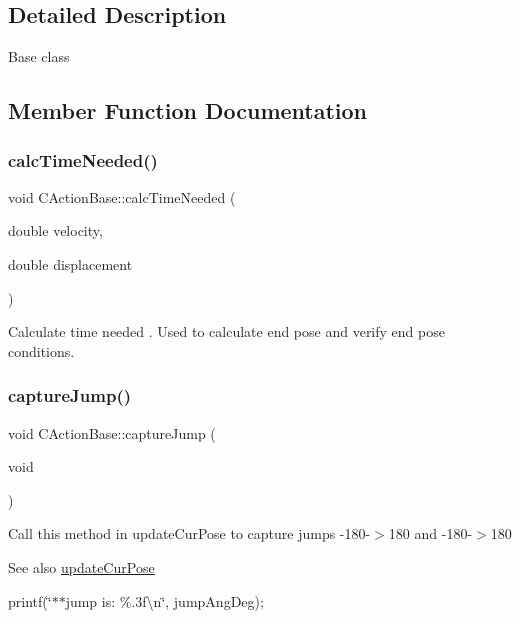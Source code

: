 \subsection{Detailed Description}
Base class ~\newline


\subsection{Member Function Documentation}
\mbox{\label{classmotion_1_1CActionBase_a90058a23162d40496c60ed44578c2f69}} 
\subsubsection{\texorpdfstring{calc\+Time\+Needed()}{calcTimeNeeded()}}
{\footnotesize\ttfamily void C\+Action\+Base\+::calc\+Time\+Needed (\begin{DoxyParamCaption}\item[{double}]{velocity,  }\item[{double}]{displacement }\end{DoxyParamCaption})}

Calculate time needed . Used to calculate end pose and verify end pose conditions. \mbox{\label{classmotion_1_1CActionBase_a48d2c07fa908bf6ed57e3219a017b25e}} 
\subsubsection{\texorpdfstring{capture\+Jump()}{captureJump()}}
{\footnotesize\ttfamily void C\+Action\+Base\+::capture\+Jump (\begin{DoxyParamCaption}\item[{void}]{ }\end{DoxyParamCaption})}

Call this method in update\+Cur\+Pose to capture jumps -\/180-\/$>$180 and -\/180-\/$>$180 \begin{DoxySeeAlso}{See also}
\mbox{\hyperlink{classmotion_1_1CActionBase_a5fd00b2fca445758e6cbf4d5a92a5082}{update\+Cur\+Pose}} 
\end{DoxySeeAlso}
printf(\char`\"{}$\ast$$\ast$jump is\+: \%.\+3f\textbackslash{}n\char`\"{}, jump\+Ang\+Deg);

